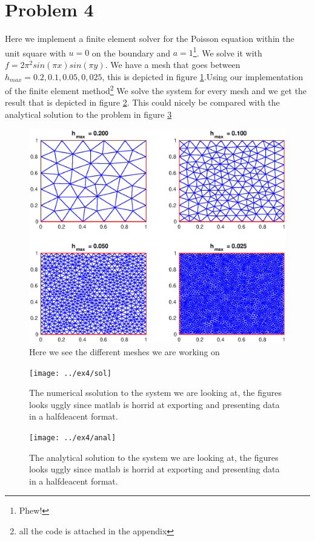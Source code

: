 \documentclass[11pt]{article}
\begin{document}
\section{Problem 4}
Here we implement a finite element solver for the Poisson equation within the unit square with $u=0$ on the boundary and $a=1$\footnote{Phew!}. We solve it with $f = 2 \pi^2 sin(\pi x) sin(\pi y)$. We have a mesh that goes between $h_{max} = 0.2,0.1,0.05,0,025$, this is depicted in figure \ref{fig:meshplot}.Using our implementation of the finite element method\footnote{all the code is attached in the appendix} We solve the system for every mesh and we get the result that is depicted in figure \ref{fig:ex4sol}. This could nicely be compared with the analytical solution to the problem in figure \ref{fig:anal}
\begin{figure}[H]
	\centering
	\includegraphics[width=1\textwidth]{../ex4/meshplot}
	\caption{Here we see the different meshes we are working on}
	\label{fig:meshplot}
\end{figure}
\begin{figure}[H]
	\centering
	\texttt{[image: ../ex4/sol]}
	\caption{The numerical ssolution to the system we are looking at, the figures looks uggly since matlab is horrid at exporting and presenting data in a halfdeacent format.}
	\label{fig:ex4sol}
\end{figure}
\begin{figure}[H]
	\centering
	\texttt{[image: ../ex4/anal]}
	\caption{The analytical solution to the system we are looking at, the figures looks uggly since matlab is horrid at exporting and presenting data in a halfdeacent format.}
	\label{fig:anal}
\end{figure}
\end{document}
